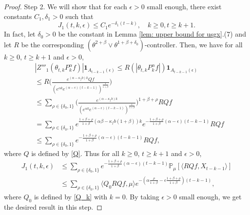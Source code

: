 \documentclass[12pt,a4paper]{amsart}
\theoremstyle{plain}
\theoremstyle{definition}
\numberwithin{equation}{section}
\begin{document}
\begin{proof}
Step 2. We will show that for each $\epsilon>0$ small enough, there exist constants $C_1, \delta_1>0$ such that
\begin{equation}
\label{lemma31q}
    J_1(t,k,\epsilon)
    \leq C_1e^{-\delta_1 (t-k)},
    \quad k\geq 0, t\geq k+1.
\end{equation}
    In fact, let $\delta_0 >0$ be the constant in Lemma \ref{lem: upper bound for usgx}.(7) and let $R$ be the corresponding $(\theta^{2+\beta}\vee \theta^{1+\beta+\delta_0})$-controller.
    Then, we have for all $k\geq 0$, $t\geq k+1$ and $\epsilon> 0$,
\begin{align}
    & |Z'''_1(\theta_{t,k}P^\alpha_k f)|\mathbf{1}_{A_{t-k-1}(\epsilon)}
    \leq R(|\theta_{t,k}P^\alpha_k f|)\mathbf{1}_{A_{t-k-1}(\epsilon)}
    \\&\leq R \Big(\frac{e^{(\alpha-\kappa_fb)k} Qf}{(e^{\alpha k}e^{(\alpha-\epsilon)(t-k-1)})^\frac{1}{1+\beta}}\Big)
    \\&\leq \sum_{\rho \in \{\delta_0, 1\}}\Big(\frac{e^{(\alpha-\kappa_fb)k}}{(e^{\alpha k}e^{(\alpha-\epsilon)(t-k-1)})^\frac{1}{1+\beta}}\Big)^{1+\beta+ \rho} RQf
    \\&=\sum_{\rho \in \{\delta_0, 1\}}e^{\frac{1+\beta + \rho}{1+\beta}(\alpha\beta-\kappa_fb(1+\beta))k}e^{-\frac{1+\beta+\rho}{1+\beta} (\alpha-\epsilon)(t-k-1)}RQf
    \\&\leq \sum_{\rho \in \{\delta_0,1\}}e^{-\frac{1+\beta+\rho}{1+\beta}(\alpha-\epsilon)(t-k-1)}RQf,
\end{align}
    where $Q$ is defined by \eqref{Q}.
    Thus for all $k\geq 0$, $t\geq k+1$ and $\epsilon> 0$,
\begin{align}
\label{eq: estimate of J1}
    J_1(t,k,\epsilon)&
    \leq \sum_{\rho \in \{\delta_0,1\}}e^{-\frac{1+\beta+\rho}{1+\beta}(\alpha-\epsilon)(t-k-1)}\mathbb{P}_{\mu}[\langle RQf,X_{t-k-1}\rangle]\\
    & \leq \sum_{\rho \in \{\delta_0,1\}} \langle Q_0 RQf, \mu \rangle e^{-(\alpha\frac{\rho}{1+\beta}-\epsilon\frac{1+\beta+\rho}{1+\beta})(t-k-1)},
\end{align}
    where $Q_0$ is defined by \eqref{Q_k} with $k=0$.
    By taking $\epsilon>0$ small enough, we get the desired result in this step.


\end{proof}
\end{document}
